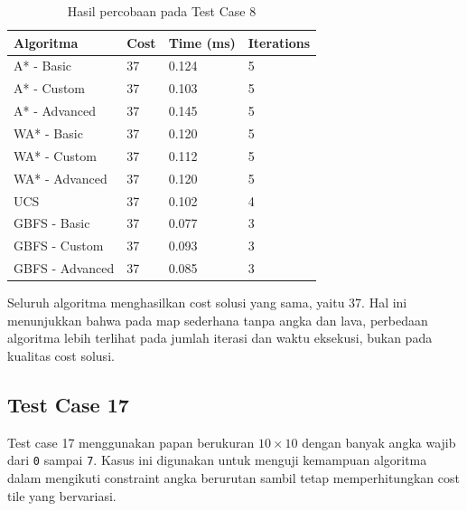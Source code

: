 \begin{table}[H]
	\centering
	\caption{Hasil percobaan pada Test Case 8}
	\small
	\begin{tabular}{|p{4cm}|p{2.5cm}|p{2.5cm}|p{2.5cm}|}
		\hline
		\rowcolor{gray!20}
		\textbf{Algoritma} & \textbf{Cost} & \textbf{Time (ms)} & \textbf{Iterations} \\
		\hline
		A* - Basic & 37 & 0.124 & 5 \\
		\hline
		A* - Custom & 37 & 0.103 & 5 \\
		\hline
		A* - Advanced & 37 & 0.145 & 5 \\
		\hline
		WA* - Basic & 37 & 0.120 & 5 \\
		\hline
		WA* - Custom & 37 & 0.112 & 5 \\
		\hline
		WA* - Advanced & 37 & 0.120 & 5 \\
		\hline
		UCS & 37 & 0.102 & 4 \\
		\hline
		GBFS - Basic & 37 & 0.077 & 3 \\
		\hline
		GBFS - Custom & 37 & 0.093 & 3 \\
		\hline
		GBFS - Advanced & 37 & 0.085 & 3 \\
		\hline
	\end{tabular}
\end{table}

\begin{tcolorbox}[
	colback=green!5,
	colframe=green!50!black,
	title=\textbf{Ringkasan Test Case 8},
	arc=2mm,
	boxrule=0.8pt
]
Seluruh algoritma menghasilkan cost solusi yang sama, yaitu 37. 
Hal ini menunjukkan bahwa pada map sederhana tanpa angka dan lava, perbedaan algoritma lebih terlihat pada jumlah iterasi dan waktu eksekusi, bukan pada kualitas cost solusi.
\end{tcolorbox}


\subsection{Test Case 17}

\begin{tcolorbox}[
	colback=blue!5,
	colframe=blue!60!black,
	title=\textbf{Ringkasan Input Test Case 17},
	arc=2mm,
	boxrule=0.8pt
]
Test case 17 menggunakan papan berukuran $10 \times 10$ dengan banyak angka wajib dari \texttt{0} sampai \texttt{7}. 
Kasus ini digunakan untuk menguji kemampuan algoritma dalam mengikuti constraint angka berurutan sambil tetap memperhitungkan cost tile yang bervariasi.
\end{tcolorbox}

